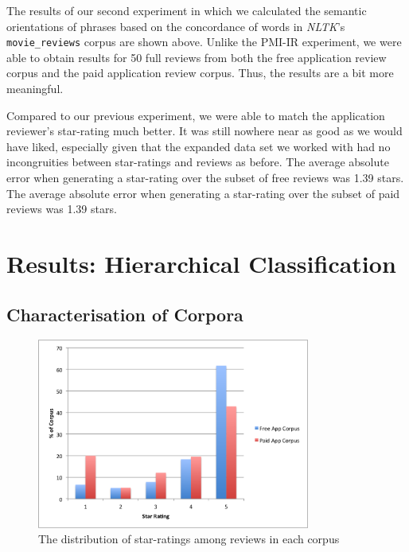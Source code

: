 \documentclass[11pt]{report} %
\begin{document}
The results of our second experiment in which we calculated the semantic orientations of phrases based on the concordance of words in \textit{NLTK}'s \verb|movie_reviews| corpus are shown above. Unlike the PMI-IR experiment, we were able to obtain results for 50 full reviews from both the free application review corpus and the paid application review corpus. Thus, the results are a bit more meaningful.

Compared to our previous experiment, we were able to match the application reviewer's star-rating much better. It was still nowhere near as good as we would have liked, especially given that the expanded data set we worked with had no incongruities between star-ratings and reviews as before. The average absolute error when generating a star-rating over the subset of free reviews was 1.39 stars. The average absolute error when generating a star-rating over the subset of paid reviews was 1.39 stars.
	

\section{Results: Hierarchical Classification}

	\subsection{Characterisation of Corpora} 

	\begin{figure}[H]
	\centering
	\includegraphics[width=0.8\textwidth]{data/dist_corpora.png}
	\caption{The distribution of star-ratings among reviews in each corpus}
	\label{fig:pmi-hc-corp-dist}
	\end{figure}
\end{document}
